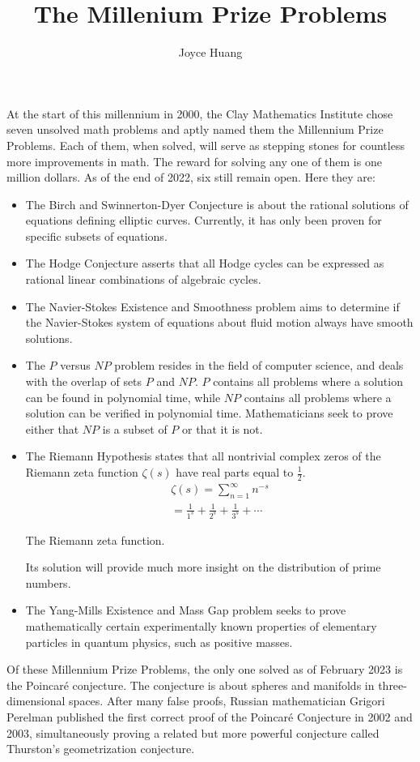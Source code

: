 \documentclass{article}
\title{The Millenium Prize Problems}
\author{Joyce Huang}
\begin{document}
\maketitle
At the start of this millennium in 2000, the Clay Mathematics Institute chose seven unsolved math problems and aptly named them the Millennium Prize Problems. Each of them, when solved, will serve as stepping stones for countless more improvements in math. The reward for solving any one of them is one million dollars. As of the end of 2022, six still remain open. Here they are:

\begin{itemize}
    \item The Birch and Swinnerton-Dyer Conjecture is about the rational solutions of equations defining elliptic curves. Currently, it has only been proven for specific subsets of equations.
    \item The Hodge Conjecture asserts that all Hodge cycles can be expressed as rational linear combinations of algebraic cycles.
    \item The Navier-Stokes Existence and Smoothness problem aims to determine if the Navier-Stokes system of equations about fluid motion always have smooth solutions.
    \item The $P$ versus $NP$ problem resides in the field of computer science, and deals with the overlap of sets $P$ and $NP$. $P$ contains all problems where a solution can be found in polynomial time, while $NP$ contains all problems where a solution can be verified in polynomial time. Mathematicians seek to prove either that $NP$ is a subset of $P$ or that it is not.
    \item The Riemann Hypothesis states that all nontrivial complex zeros of the Riemann zeta function $\zeta(s)$ have real parts equal to $\frac12$. 
    \begin{multline*}
    \zeta(s)=\sum_{n=1}^{\infty}n^{-s} \\
    =\frac1{1^s}+\frac1{2^s}+\frac1{3^s}+\cdots
    \end{multline*}
    \begin{center}
        \footnotesize
        The Riemann zeta function.
    \end{center}
    Its solution will provide much more insight on the distribution of prime numbers.
    \item The Yang-Mills Existence and Mass Gap problem seeks to prove mathematically certain experimentally known properties of elementary particles in quantum physics, such as positive masses.
\end{itemize}
Of these Millennium Prize Problems, the only one solved as of February 2023 is the Poincar\'e conjecture. The conjecture is about spheres and manifolds in three-dimensional spaces. After many false proofs, Russian mathematician Grigori Perelman published the first correct proof of the Poincar\'e Conjecture in 2002 and 2003, simultaneously proving a related but more powerful conjecture called Thurston's geometrization conjecture.
\end{document}
